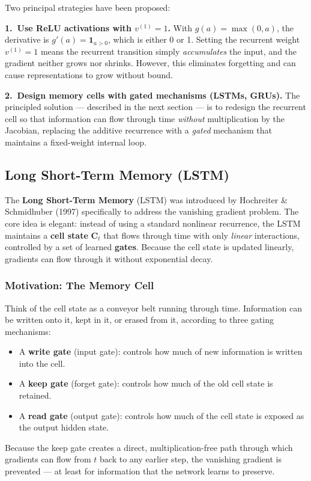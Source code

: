 \documentclass[11pt,a4paper]{article}
\newcommand{\term}[1]{\textcolor{DefGreen}{\textbf{#1}}\index{#1}}
\begin{document}
Two principal strategies have been proposed:

\textbf{1.\ Use ReLU activations with $v^{(1)} = 1$.}
With $g(a) = \max(0, a)$, the derivative is $g'(a) = \mathbf{1}_{a > 0}$, which is either 0 or 1. Setting the recurrent weight $v^{(1)} = 1$ means the recurrent transition simply \emph{accumulates} the input, and the gradient neither grows nor shrinks. However, this eliminates forgetting and can cause representations to grow without bound.

\textbf{2.\ Design memory cells with gated mechanisms (LSTMs, GRUs).}
The principled solution — described in the next section — is to redesign the recurrent cell so that information can flow through time \emph{without} multiplication by the Jacobian, replacing the additive recurrence with a \emph{gated} mechanism that maintains a fixed-weight internal loop.

\subsection{Long Short-Term Memory (LSTM)}
\label{sec:lstm}

The \term{Long Short-Term Memory} (LSTM) was introduced by Hochreiter \& Schmidhuber (1997) specifically to address the vanishing gradient problem. The core idea is elegant: instead of using a standard nonlinear recurrence, the LSTM maintains a \term{cell state} $\mathbf{C}_t$ that flows through time with only \emph{linear} interactions, controlled by a set of learned \term{gates}. Because the cell state is updated linearly, gradients can flow through it without exponential decay.

\subsubsection{Motivation: The Memory Cell}

Think of the cell state as a conveyor belt running through time. Information can be written onto it, kept in it, or erased from it, according to three gating mechanisms:
\begin{itemize}
  \item A \textbf{write gate} (input gate): controls how much of new information is written into the cell.
  \item A \textbf{keep gate} (forget gate): controls how much of the old cell state is retained.
  \item A \textbf{read gate} (output gate): controls how much of the cell state is exposed as the output hidden state.
\end{itemize}
Because the keep gate creates a direct, multiplication-free path through which gradients can flow from $t$ back to any earlier step, the vanishing gradient is prevented — at least for information that the network learns to preserve.
\end{document}
